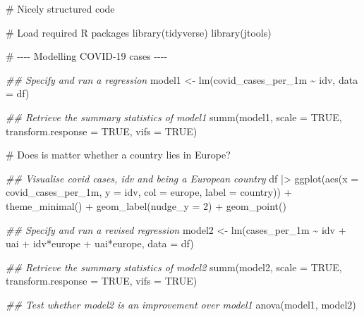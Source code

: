\documentclass[
  letterpaper,
  DIV=11,
  numbers=noendperiod]{scrreprt}
\newenvironment{Shaded}{\begin{snugshade}}{\end{snugshade}}
\newcommand{\AttributeTok}[1]{\textcolor[rgb]{0.40,0.45,0.13}{#1}}
\newcommand{\CommentTok}[1]{\textcolor[rgb]{0.37,0.37,0.37}{#1}}
\newcommand{\ConstantTok}[1]{\textcolor[rgb]{0.56,0.35,0.01}{#1}}
\newcommand{\DecValTok}[1]{\textcolor[rgb]{0.68,0.00,0.00}{#1}}
\newcommand{\DocumentationTok}[1]{\textcolor[rgb]{0.37,0.37,0.37}{\textit{#1}}}
\newcommand{\FunctionTok}[1]{\textcolor[rgb]{0.28,0.35,0.67}{#1}}
\newcommand{\NormalTok}[1]{\textcolor[rgb]{0.00,0.23,0.31}{#1}}
\newcommand{\OtherTok}[1]{\textcolor[rgb]{0.00,0.23,0.31}{#1}}
\newcommand{\SpecialCharTok}[1]{\textcolor[rgb]{0.37,0.37,0.37}{#1}}
\begin{document}
\begin{Shaded}
\begin{Highlighting}[]
\CommentTok{\# Nicely structured code}

\CommentTok{\# Load required R packages}
\FunctionTok{library}\NormalTok{(tidyverse)}
\FunctionTok{library}\NormalTok{(jtools)}

\CommentTok{\# {-}{-}{-}{-} Modelling COVID{-}19 cases {-}{-}{-}{-}}

\DocumentationTok{\#\# Specify and run a regression}
\NormalTok{model1 }\OtherTok{\textless{}{-}} \FunctionTok{lm}\NormalTok{(covid\_cases\_per\_1m }\SpecialCharTok{\textasciitilde{}}\NormalTok{ idv, }\AttributeTok{data =}\NormalTok{ df)}

\DocumentationTok{\#\# Retrieve the summary statistics of model1}
\FunctionTok{summ}\NormalTok{(model1,}
     \AttributeTok{scale =} \ConstantTok{TRUE}\NormalTok{,}
     \AttributeTok{transform.response =} \ConstantTok{TRUE}\NormalTok{,}
     \AttributeTok{vifs =} \ConstantTok{TRUE}\NormalTok{)}

\CommentTok{\# Does is matter whether a country lies in Europe?}

\DocumentationTok{\#\# Visualise covid cases, idv and being a European country}
\NormalTok{df }\SpecialCharTok{|\textgreater{}}
  \FunctionTok{ggplot}\NormalTok{(}\FunctionTok{aes}\NormalTok{(}\AttributeTok{x =}\NormalTok{ covid\_cases\_per\_1m,}
             \AttributeTok{y =}\NormalTok{ idv,}
             \AttributeTok{col =}\NormalTok{ europe,}
             \AttributeTok{label =}\NormalTok{ country)) }\SpecialCharTok{+}
  \FunctionTok{theme\_minimal}\NormalTok{() }\SpecialCharTok{+}
  \FunctionTok{geom\_label}\NormalTok{(}\AttributeTok{nudge\_y =} \DecValTok{2}\NormalTok{) }\SpecialCharTok{+}
  \FunctionTok{geom\_point}\NormalTok{()}

\DocumentationTok{\#\# Specify and run a revised regression}
\NormalTok{model2 }\OtherTok{\textless{}{-}} \FunctionTok{lm}\NormalTok{(cases\_per\_1m }\SpecialCharTok{\textasciitilde{}}\NormalTok{ idv }\SpecialCharTok{+}\NormalTok{ uai }\SpecialCharTok{+}\NormalTok{ idv}\SpecialCharTok{*}\NormalTok{europe }\SpecialCharTok{+}\NormalTok{ uai}\SpecialCharTok{*}\NormalTok{europe,}
                 \AttributeTok{data =}\NormalTok{ df)}

\DocumentationTok{\#\# Retrieve the summary statistics of model2}
\FunctionTok{summ}\NormalTok{(model2,}
     \AttributeTok{scale =} \ConstantTok{TRUE}\NormalTok{,}
     \AttributeTok{transform.response =} \ConstantTok{TRUE}\NormalTok{,}
     \AttributeTok{vifs =} \ConstantTok{TRUE}\NormalTok{)}

\DocumentationTok{\#\# Test whether model2 is an improvement over model1}
\FunctionTok{anova}\NormalTok{(model1, model2)}
\end{Highlighting}
\end{Shaded}
\end{document}
